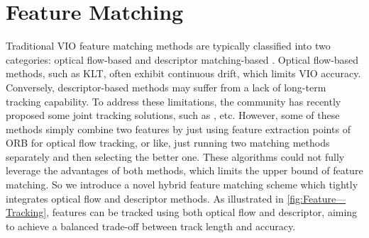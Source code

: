 \section{Feature Matching}
\label{sec:Hybrid-Feature-Tracking}
Traditional VIO feature matching methods are typically classified into two categories: optical flow-based \cite{qin-tro-2018_VINS-Mono,geneva2020openvins} and descriptor matching-based \cite{leutenegger-ijrr-2015-OKVIS,campos2021orb-slam3}. Optical flow-based methods, such as KLT\cite{Lucas_Kanade_1981_KLT,opencv_library}, often exhibit continuous drift, which limits VIO accuracy. Conversely, descriptor-based methods may suffer from a lack of long-term tracking capability. To address these limitations, the community has recently proposed some joint tracking solutions, such as \cite{zong2017improved,zhong2023improved,bang2017camera}, etc. However, some\cite{zong2017improved,zhong2023improved} of these methods simply combine two features by just using feature extraction points of ORB for optical flow tracking, or like\cite{bang2017camera}, just running two matching methods separately and then selecting the better one. These algorithms could not fully leverage the advantages of both methods, which limits the upper bound of feature matching. So we introduce a novel hybrid feature matching scheme which tightly integrates optical flow and descriptor methods. As illustrated in \cref{fig:Feature—Tracking}, features can be tracked using both optical flow and descriptor, aiming to achieve a balanced trade-off between track length and accuracy.




